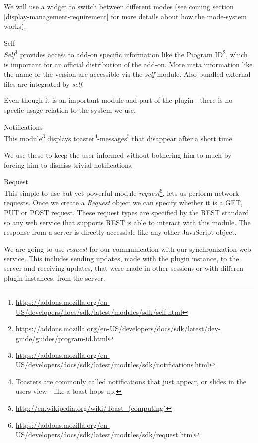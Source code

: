 \begin{description}
We will use a widget to switch between different modes (see coming section \ref{display-management-requirement} for more details about how the mode-system works).

\item Self\\
\emph{Self}\footnote{\url{https://addons.mozilla.org/en-US/developers/docs/sdk/latest/modules/sdk/self.html}} provides access to add-on specific information like the Program ID\footnote{\url{https://addons.mozilla.org/en-US/developers/docs/sdk/latest/dev-guide/guides/program-id.html}}, which is important for an official distribution of the add-on. More meta information like the name or the version are accessible via the \emph{self} module. Also bundled external files are integrated by \emph{self}.

Even though it is an important module and part of the plugin - there is no specfic usage relation to the system we use. 

\item Notifications\\
This module\footnote{\url{https://addons.mozilla.org/en-US/developers/docs/sdk/latest/modules/sdk/notifications.html}} displays toaster\footnote{Toasters are commonly called notifications that just appear, or slides in the users view - like a toast hops up.}-messages\footnote{\url{http://en.wikipedia.org/wiki/Toast_(computing)}} that disappear after a short time.

We use these to keep the user informed without bothering him to much by forcing him to dismiss trivial notifications.

\item Request\\
This simple to use but yet powerful module \emph{request}\footnote{\url{https://addons.mozilla.org/en-US/developers/docs/sdk/latest/modules/sdk/request.html}}, lets us perform network requests. Once we create a \emph{Request} object we can specify whether it is a GET, PUT or POST request. These request types are specified by the REST standard so any web service that supports REST is able to interact with this module\cite{fielding2000principled}. The response from a server is directly accessible like any other JavaScript object. 

We are going to use \emph{request} for our communication with our synchronization web service. This includes sending updates, made with the plugin instance, to the server and receiving updates, that were made in other sessions or with differen plugin instances, from the server. 

\end{description}

